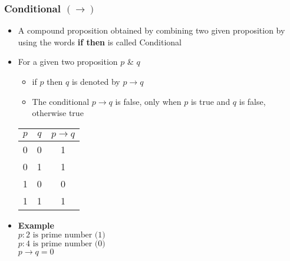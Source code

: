 \documentclass{article}
\begin{document}
	\subsubsection{Conditional $(\to)$}
	\begin{itemize}
		\item A compound proposition obtained by combining two given proposition by using the words
			\textbf{if then} is called Conditional
		\item For a given two proposition $p$ \& $q$
			\begin{itemize}
				\item if $p$ then $q$ is denoted by $p\to q$
				\item The conditional $p\to q$ is false, only when $p$ is true and $q$ is
					false, otherwise true
			\end{itemize}
			\begin{center}
				\begin{tabular}{|c|c|c|} \hline
					$p$ & $q$ & $p\to q$ \\ \hline
					0 & 0 & 1 \\
					0 & 1 & 1 \\
					1 & 0 & 0 \\
					1 & 1 & 1 \\ \hline
				\end{tabular}
			\end{center}
		\item [] \textbf{Example} \\
			$p : \text{2 is prime number (1)}$ \\
			$p : \text{4 is prime number (0)}$ \\
			$p\to q=0$
	\end{itemize}
\end{document}
